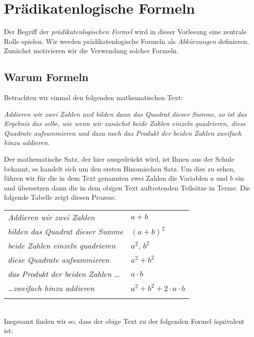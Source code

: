 \chapter{Pr\"adikatenlogische Formeln}
Der Begriff der \emph{pr\"adikatenlogischen Formel} wird in dieser Vorlesung eine zentrale
Rolle spielen.  Wir werden pr\"adikatenlogische Formeln als \emph{Abk\"urzungen} definieren.  
Zun\"achst motivieren wir die Verwendung solcher Formeln.

\section{Warum Formeln}
Betrachten wir einmal den folgenden mathematischen Text: 
\begin{center}
\begin{minipage}{14cm}
{\em 
  Addieren wir zwei Zahlen und bilden dann das Quadrat dieser Summe, so ist das Ergebnis das
  selbe, wie wenn wir zun\"achst beide Zahlen einzeln quadrieren, diese Quadrate aufsummieren 
  und dazu noch das Produkt der beiden Zahlen zweifach hinzu addieren.
}
\end{minipage}
\end{center}
Der mathematische Satz, der hier ausgedr\"uckt wird, ist Ihnen aus der Schule bekannt,
es handelt sich um den ersten Binomischen Satz.  Um dies zu sehen, f\"uhren wir f\"ur die
in dem Text genannten zwei Zahlen die Variablen $a$ und $b$ ein und \"ubersetzen dann die 
in dem obigen Text auftretenden Teils\"atze in Terme.  Die folgende Tabelle zeigt diesen Prozess: \\[0.3cm]
\hspace*{1.3cm} 
\begin{tabular}{ll}
  \emph{Addieren wir zwei Zahlen} & $a+b$ \\
  \emph{bilden das Quadrat dieser Summe} & $(a+b)^2$ \\
  \emph{beide Zahlen einzeln quadrieren} & $a^2$, $b^2$ \\
  \emph{diese Quadrate aufsummieren} & $a^2 + b^2$ \\
  \emph{das Produkt der beiden Zahlen \ldots} & $a\cdot b$ \\
  \emph{\ldots zweifach hinzu addieren} & $a^2 + b^2 + 2\cdot a \cdot b $ \\
  \emph{} & $ $ \\
\end{tabular} \\
Insgesamt finden wir so, dass der obige Text zu der folgenden Formel \"aquivalent ist: \\[0.2cm]
